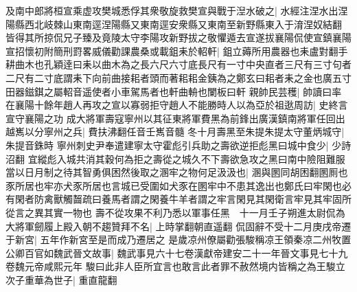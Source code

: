 及南中郎將桓宣乘虚攻樊城悉俘其衆敬旋救樊宣與戰于湼水破之|{
	水經注涅水出涅陽縣西北岐棘山東南逕涅陽縣又東南逕安衆縣又東南至新野縣東入于淯涅奴結翻}
皆得其所掠侃兄子臻及竟陵太守李陽攻新野拔之敬懼遁去宣遂拔襄陽侃使宣鎮襄陽宣招懷初附簡刑罸畧威儀勸課農桑或載鉏耒於軺軒|{
	鉏立薅所用農器也耒盧對翻手耕曲木也孔穎逹曰耒以曲木為之長六尺六寸底長尺有一寸中央直者三尺有三寸句者二尺有二寸底謂耒下向前曲接耜者頭而著耜耜金銕為之鄭玄曰耜者耒之金也廣五寸田器鎡錤之屬軺音遥使者小車駕馬者也軒曲輈也闌板曰軒}
親帥民芸穫|{
	帥讀曰率}
在襄陽十餘年趙人再攻之宣以寡弱拒守趙人不能勝時人以為亞於祖逖周訪|{
	史終言宣守襄陽之功}
成大將軍壽寇寧州以其征東將軍費黑為前鋒出廣漢鎮南將軍任回出越嶲以分寧州之兵|{
	費扶沸翻任音壬嶲音髓}
冬十月壽黑至朱提朱提太守董炳城守|{
	朱提音銖時}
寧州刺史尹奉遣建寧太守霍彪引兵助之壽欲逆拒彪黑曰城中食少|{
	少詩沼翻}
宜縱彪入城共消其穀何為拒之壽從之城久不下壽欲急攻之黑曰南中險阻難服當以日月制之待其智勇俱困然後取之溷牢之物何足汲汲也|{
	溷與圂同胡困翻圂厠也豕所居也牢亦犬豕所居也言城已受圍如犬豕在圂牢中不患其逸出也鄭氏曰牢閑也必有閑者防禽獸觸齧疏曰養馬者謂之閑養牛羊者謂之牢言閑見其閑衛言牢見其牢固所從言之異其實一物也}
壽不從攻果不利乃悉以軍事任黑　十一月壬子朔進太尉侃為大將軍劒履上殿入朝不趨贊拜不名|{
	上時掌翻朝直遥翻}
侃固辭不受十二月庚戌帝遷于新宮|{
	五年作新宮至是而成乃遷居之}
是歲凉州僚屬勸張駿稱凉王領秦凉二州牧置公卿百官如魏武晉文故事|{
	魏武事見六十七卷漢獻帝建安二十一年晉文事見七十九卷魏元帝咸熙元年}
駿曰此非人臣所宜言也敢言此者罪不赦然境内皆稱之為王駿立次子重華為世子|{
	重直龍翻}


